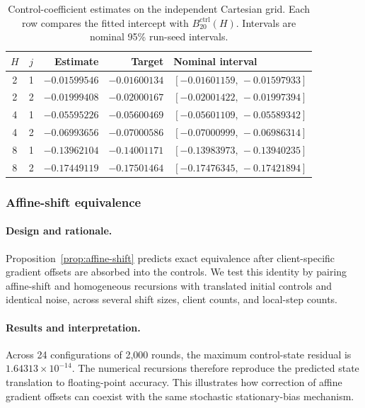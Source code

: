 \begin{table}[t]
\centering\small
\caption{Control-coefficient estimates on the independent Cartesian grid.
Each row compares the fitted intercept with $B_{20}^{\mathrm{ctrl}}(H)$.
Intervals are nominal 95\% run-seed intervals.}
\label{tab:supp-control}
\begin{tabular}{@{}ccrrl@{}}\toprule
$H$ & $j$ & Estimate & Target & Nominal interval \\ \midrule
2 & 1 & $-0.01599546$ & $-0.01600134$ & $[-0.01601159,\,-0.01597933]$ \\
2 & 2 & $-0.01999408$ & $-0.02000167$ & $[-0.02001422,\,-0.01997394]$ \\
4 & 1 & $-0.05595226$ & $-0.05600469$ & $[-0.05601109,\,-0.05589342]$ \\
4 & 2 & $-0.06993656$ & $-0.07000586$ & $[-0.07000999,\,-0.06986314]$ \\
8 & 1 & $-0.13962104$ & $-0.14001171$ & $[-0.13983973,\,-0.13940235]$ \\
8 & 2 & $-0.17449119$ & $-0.17501464$ & $[-0.17476345,\,-0.17421894]$ \\
\bottomrule
\end{tabular}
\end{table}

\subsubsection{Affine-shift equivalence}
\label{sec:num-affine}

\paragraph{Design and rationale.}
Proposition~\ref{prop:affine-shift} predicts exact equivalence after
client-specific gradient offsets are absorbed into the controls. We test
this identity by pairing affine-shift and homogeneous recursions with
translated initial controls and identical noise, across several shift
sizes, client counts, and local-step counts.

\paragraph{Results and interpretation.}
Across 24 configurations of 2,000 rounds, the maximum control-state
residual is $1.64313\times10^{-14}$. The numerical recursions therefore
reproduce the predicted state translation to floating-point accuracy.
This illustrates how correction of affine gradient offsets can coexist
with the same stochastic stationary-bias mechanism.

